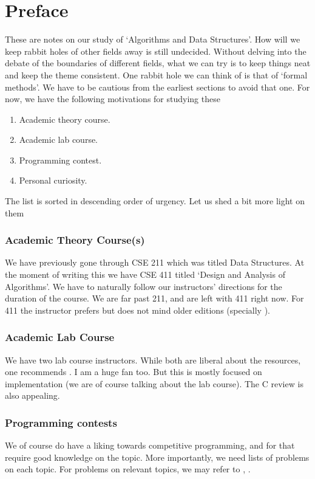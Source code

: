 \documentclass[../../main.tex]{subfiles}
\begin{document}
\chapter{Preface}

These are notes on our study of `Algorithms and Data Structures'. How
will we keep rabbit holes of other fields away is still
undecided. Without delving into the debate of the boundaries of
different fields, what we can try is to keep things neat and keep the
theme consistent. One rabbit hole we can think of is that of `formal
methods'. We have to be cautious from the earliest sections to avoid
that one. For now, we have the following motivations for studying
these

\begin{enumerate}[itemsep=-0.5em, topsep=0pt]
\item Academic theory course.
\item Academic lab course.
\item Programming contest.
\item Personal curiosity.
\end{enumerate}

\noindent
The list is sorted in descending order of urgency. Let us shed a bit
more light on them



\subsection{Academic Theory Course(s)}
We have previously gone through CSE 211 which was titled Data
Structures. At the moment of writing this we have CSE 411 titled
`Design and Analysis of Algorithms'. We have to naturally follow our
instructors' directions for the duration of the course. We are far
past 211, and are left with 411 right now. For 411 the instructor
prefers \cite{clrs4} but does not mind older editions (specially
\cite{clrs3}).


\subsection{Academic Lab Course}
We have two lab course instructors. While both are liberal about the
resources, one recommends \cite{Aspnes}. I am a huge fan too. But this
is mostly focused on implementation (we are of course talking about the
lab course). The C review is also appealing.


\subsection{Programming contests}
We of course do have a liking towards competitive programming, and for
that require good knowledge on the topic. More importantly, we need
lists of problems on each topic. For problems on relevant topics, we
may refer to \cite{cpalgo}, \cite{shohagTopics}.
\end{document}
